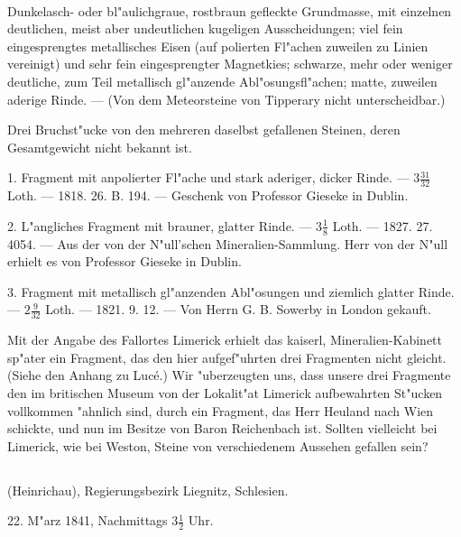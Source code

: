 \documentclass[a4paper, 11pt, oneside, polutonikogreek, german]{article}
\begin{document}
\paragraph{}
Dunkelasch- oder bl"aulichgraue, rostbraun gefleckte Grundmasse, mit einzelnen deutlichen, meist aber undeutlichen kugeligen Ausscheidungen; viel fein eingesprengtes metallisches Eisen (auf polierten Fl"achen zuweilen zu Linien vereinigt) und sehr fein eingesprengter Magnetkies; schwarze, mehr oder weniger deutliche, zum Teil metallisch gl"anzende Abl"osungsfl"achen; matte, zuweilen aderige Rinde. --- (Von dem Meteorsteine von Tipperary nicht unterscheidbar.)

Drei Bruchst"ucke von den mehreren daselbst gefallenen Steinen, deren Gesamtgewicht nicht bekannt ist.

1. Fragment mit anpolierter Fl"ache und stark aderiger, dicker Rinde. --- $\mathfrak{3\frac{31}{32}}$ Loth. --- 1818. 26. B. 194. --- Geschenk von Professor Gieseke in Dublin.

2. L"angliches Fragment mit brauner, glatter Rinde. --- $\mathfrak{3\frac{1}{8}}$ Loth. --- 1827. 27. 4054. --- Aus der von der N"ull'schen Mineralien-Sammlung. Herr von der N"ull erhielt es von Professor Gieseke in Dublin.

3. Fragment mit metallisch gl"anzenden Abl"osungen und ziemlich glatter Rinde. --- $\mathfrak{2\frac{9}{32}}$ Loth. --- 1821. 9. 12. --- Von Herrn G. B. Sowerby in London gekauft.

\setlength{\leftskip}{10mm}
\setlength{\parindent}{0pt}

{\footnotesize Mit der Angabe des Fallortes Limerick erhielt das kaiserl, Mineralien-Kabinett sp"ater ein Fragment, das den hier aufgef"uhrten drei Fragmenten nicht gleicht. (Siehe den Anhang zu Lucé.) Wir "uberzeugten uns, dass unsere drei Fragmente den im britischen Museum von der Lokalit"at Limerick aufbewahrten St"ucken vollkommen "ahnlich sind, durch ein Fragment, das Herr Heuland nach Wien schickte, und nun im Besitze von Baron Reichenbach ist. Sollten vielleicht bei Limerick, wie bei Weston, Steine von verschiedenem Aussehen gefallen sein?}

\setlength{\leftskip}{0pt}
\setlength{\parindent}{20pt}

\subsection{}
\begin{center}

(Heinrichau), Regierungsbezirk Liegnitz, Schlesien.

22. M"arz 1841, Nachmittags $\mathfrak{3\frac{1}{2}}$ Uhr.
\end{center}
\end{document}

